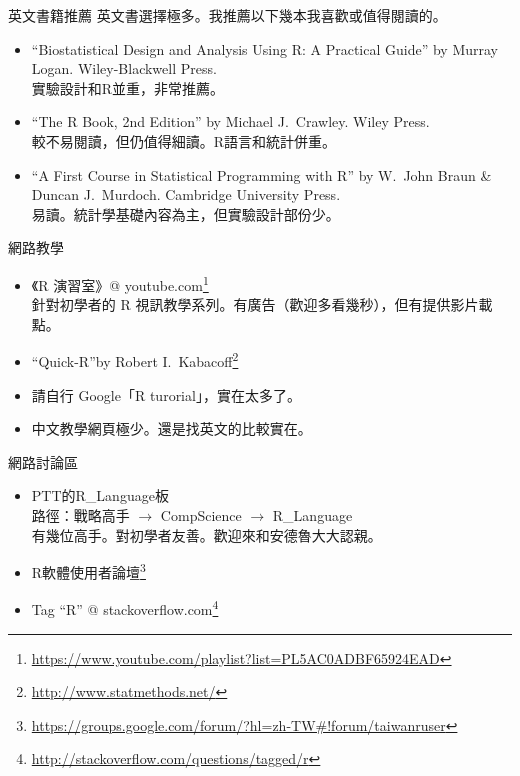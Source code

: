 \documentclass[12pt, aspectratio=43]{beamer}
\let\oldfootnote\footnote
\renewcommand\footnote[1]{\hspace{-0.3em}\oldfootnote{\ignorespaces#1}\hspace{0.3em}}
\begin{document}
\begin{frame}{英文書籍推薦}
英文書選擇極多。我推薦以下幾本我喜歡或值得閱讀的。
\begin{itemize}
\item ``Biostatistical Design and Analysis Using R: A Practical Guide'' by Murray Logan. Wiley-Blackwell Press.\\ 實驗設計和R並重，非常推薦。
\item ``The R Book, 2nd Edition'' by Michael J.~Crawley. Wiley Press. \\ 較不易閱讀，但仍值得細讀。R語言和統計併重。
\item ``A First Course in Statistical Programming with R'' by W.~John Braun \& Duncan J.~Murdoch. Cambridge University Press. \\ 易讀。統計學基礎內容為主，但實驗設計部份少。
\end{itemize}
\end{frame}


\begin{frame}{網路教學}
\begin{itemize}
\item 《R 演習室》\makeatletter @ \makeatother youtube.com\oldfootnote{\url{https://www.youtube.com/playlist?list=PL5AC0ADBF65924EAD}} \\ 針對初學者的 R 視訊教學系列。有廣告（歡迎多看幾秒），但有提供影片載點。
\item ``Quick-R''by Robert I.~Kabacoff\oldfootnote{\url{http://www.statmethods.net/}}
\item 請自行 Google「R turorial」，實在太多了。
\item 中文教學網頁極少。還是找英文的比較實在。
\end{itemize}
\end{frame}


\begin{frame}{網路討論區}
\begin{itemize}
\item PTT的R\_Language板 \\ 路徑：戰略高手 $\rightarrow$ CompScience $\rightarrow$ R\_Language\\ 有幾位高手。對初學者友善。歡迎來和安德魯大大認親。
\item R軟體使用者論壇\oldfootnote{\url{https://groups.google.com/forum/?hl=zh-TW\#!forum/taiwanruser}}
\item Tag ``R''  \makeatletter @ \makeatother stackoverflow.com\oldfootnote{\url{http://stackoverflow.com/questions/tagged/r}}
\end{itemize}
\end{frame}
\end{document}
